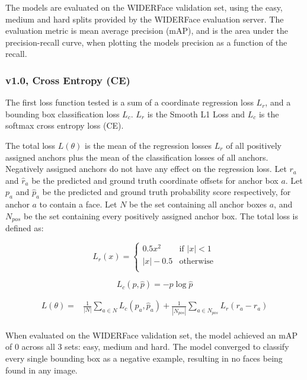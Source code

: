 \documentclass[a4paper, twoside]{article}
\begin{document}
The models are evaluated on the WIDERFace validation set, using the easy, medium and hard splits provided by the WIDERFace evaluation server. The evaluation metric is mean average precision (mAP), and is the area under the precision-recall curve, when plotting the models precision as a function of the recall.

\subsubsection{v1.0, Cross Entropy (CE)}
The first loss function tested is a sum of a coordinate regression loss $L_r$, and a bounding box classification loss $L_c$. $L_r$ is the Smooth L1 Loss \cite{cs231n} and $L_c$ is the softmax cross entropy loss (CE).

The total loss $L(\theta)$ is the mean of the regression losses $L_r$ of all positively assigned anchors plus the mean of the classification losses of all anchors. Negatively assigned anchors do not have any effect on the regression loss. Let $r_a$ and $\hat{r}_a$ be the predicted and ground truth coordinate offsets for anchor box $a$. Let $p_a$ and $\hat{p}_a$ be the predicted and ground truth probability score respectively, for anchor $a$ to contain a face. Let $N$ be the set containing all anchor boxes $a$, and $N_{pos}$ be the set containing every positively assigned anchor box. The total loss is defined as:

\begin{equation}\label{eqfocalloss}
L_r(x) = \begin{cases}
				0.5x^2 & \mbox{if } |x| < 1\\
				|x| - 0.5 & \mbox{otherwise}\\
			\end{cases}
\end{equation}

\begin{equation}\label{eqsmoothl1loss}
L_c(p, \hat{p}) = -p \log{\hat{p}}
\end{equation}



\begin{equation}
\begin{split}
	L(\theta) = &  \frac{1}{|N|} \sum_{a \in N} L_c(p_a, \hat{p}_a) 
	 + \frac{1}{|N_{pos}|} \sum_{a \in N_{pos}} L_r(r_a - \hat{r}_a)  \\ 
\end{split}
\end{equation}

When evaluated on the WIDERFace validation set, the model achieved an mAP of 0 across all 3 sets: easy, medium and hard. The model converged to classify every single bounding box as a negative example, resulting in no faces being found in any image.
\end{document}
